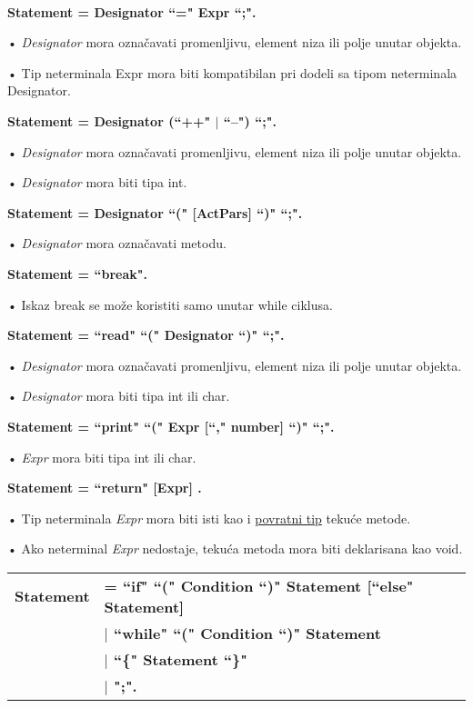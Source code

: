 \hRule \\[0.2cm] 
  
\textbf{Statement = Designator ``=" Expr ``;".} 

• \textit{Designator} mora označavati promenljivu, element niza ili polje unutar objekta. 

• Tip neterminala Expr mora biti kompatibilan pri dodeli sa tipom neterminala Designator. 
 
\textbf{Statement = Designator (``++" $\mid$ ``--") ``;".} 

• \textit{Designator} mora označavati promenljivu, element niza ili polje unutar objekta. 

• \textit{Designator} mora biti tipa int. 
 
\textbf{Statement = Designator ``(" [ActPars] ``)"{} ``;".} 

• \textit{Designator} mora označavati metodu. 
 
\textbf{Statement = ``break".} 

• Iskaz break se može koristiti samo unutar while ciklusa. 
 
\textbf{Statement = ``read"{} ``("{} Designator ``)"{} ``;".} 

• \textit{Designator} mora označavati promenljivu, element niza ili polje unutar objekta. 

• \textit{Designator} mora biti tipa int ili char. 
 
\textbf{Statement = ``print"{} ``("{} Expr [``," number] ``)"{} ``;".} 

• \textit{Expr} mora biti tipa int ili char. 
  
\textbf{Statement = ``return" [Expr] .} 

• Tip neterminala \textit{Expr} mora biti isti kao i \underline{povratni tip} tekuće metode.

• Ako neterminal \textit{Expr} nedostaje, tekuća metoda mora biti deklarisana kao void. 

\begin{tabular}{l l}
\textbf{Statement} & \textbf{= ``if" ``("{} Condition ``)"{} Statement [``else"{} Statement]}\\
& \textbf{$\mid$ ``while" ``("{} Condition ``)"{} Statement} \\
& \textbf{$\mid$ ``\{" {Statement} ``\}"} \\
& \textbf{$\mid$ ";".} 
\end{tabular}

\hRule \\[0.2cm]

